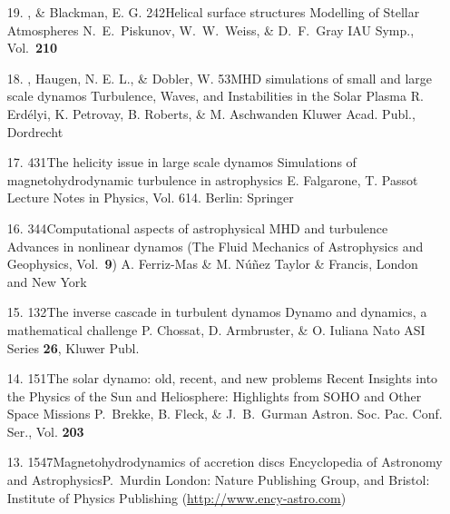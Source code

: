 \begin{itemize}
\item[19.]
\Brandenburg, \& Blackman, E. G.
{242}{Helical surface structures}
{Modelling of Stellar Atmospheres}
{N.~E.~Piskunov, W.~W.~Weiss, \& D.~F.~Gray}
{IAU Symp., Vol.\ {\bf 210}}

\item[18.]
\Brandenburg, Haugen, N. E. L., \& Dobler, W.
{53}{MHD simulations of small and large scale dynamos}
{Turbulence, Waves, and Instabilities in the Solar Plasma}
{R. Erd\'elyi, K. Petrovay, B. Roberts, \& M. Aschwanden}
{Kluwer Acad. Publ., Dordrecht}

\item[17.]
\Brandenburg{}
{431}{The helicity issue in large scale dynamos}
{Simulations of magnetohydrodynamic turbulence in astrophysics}
{E. Falgarone, T. Passot}
{Lecture Notes in Physics, Vol. 614. Berlin: Springer}

\item[16.]
\Brandenburg{}
{344}{Computational aspects of astrophysical MHD and turbulence}
{Advances in nonlinear dynamos
(The Fluid Mechanics of Astrophysics and Geophysics, Vol.\ {\bf9})}
{A. Ferriz-Mas \& M. N\'u\~nez}
{Taylor \& Francis, London and New York}

\item[15.]
\Brandenburg{}
{132}{The inverse cascade in turbulent dynamos}
{Dynamo and dynamics, a mathematical challenge}
{P. Chossat, D. Armbruster, \& O. Iuliana}
{Nato ASI Series {\bf 26}, Kluwer Publ.}

\item[14.]
\Brandenburg{}
{151}{The solar dynamo: old, recent, and new problems}
{Recent Insights into the Physics of the Sun and Heliosphere:
Highlights from SOHO and Other Space Missions}
{P.\ Brekke, B. Fleck, \& J.\ B.\ Gurman}
{Astron. Soc. Pac. Conf. Ser., Vol. {\bf 203}}

\item[13.]
\Brandenburg{}
{1547}{Magnetohydrodynamics of accretion discs}
{Encyclopedia of Astronomy and Astrophysics}{P.~Murdin}
{London: Nature Publishing Group, and Bristol: Institute of Physics Publishing}
(\url{http://www.ency-astro.com})


\end{itemize}

